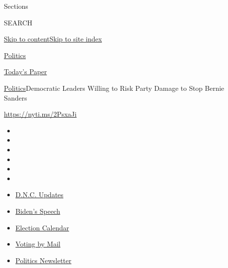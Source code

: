 Sections

SEARCH

\protect\hyperlink{site-content}{Skip to
content}\protect\hyperlink{site-index}{Skip to site index}

\href{https://www.nytimes3xbfgragh.onion/section/politics}{Politics}

\href{https://myaccount.nytimes3xbfgragh.onion/auth/login?response_type=cookie\&client_id=vi}{}

\href{https://www.nytimes3xbfgragh.onion/section/todayspaper}{Today's
Paper}

\href{/section/politics}{Politics}\textbar{}Democratic Leaders Willing
to Risk Party Damage to Stop Bernie Sanders

\url{https://nyti.ms/2PsxaJi}

\begin{itemize}
\item
\item
\item
\item
\item
\item
\end{itemize}

\begin{itemize}
\item
  \href{https://www.nytimes3xbfgragh.onion/live/2020/08/20/us/dnc-convention-election?action=click\&pgtype=Article\&state=default\&region=TOP_BANNER\&context=storylines_menu}{D.N.C.
  Updates}
\item
  \href{https://www.nytimes3xbfgragh.onion/2020/08/20/us/politics/biden-presidential-nomination-dnc.html?action=click\&pgtype=Article\&state=default\&region=TOP_BANNER\&context=storylines_menu}{Biden's
  Speech}
\item
  \href{https://www.nytimes3xbfgragh.onion/interactive/2019/us/elections/2020-presidential-election-calendar.html?action=click\&pgtype=Article\&state=default\&region=TOP_BANNER\&context=storylines_menu}{Election
  Calendar}
\item
  \href{https://www.nytimes3xbfgragh.onion/interactive/2020/08/11/us/politics/vote-by-mail-us-states.html?action=click\&pgtype=Article\&state=default\&region=TOP_BANNER\&context=storylines_menu}{Voting
  by Mail}
\item
  \href{https://www.nytimes3xbfgragh.onion/newsletters/politics?action=click\&pgtype=Article\&state=default\&region=TOP_BANNER\&context=storylines_menu}{Politics
  Newsletter}
\end{itemize}

